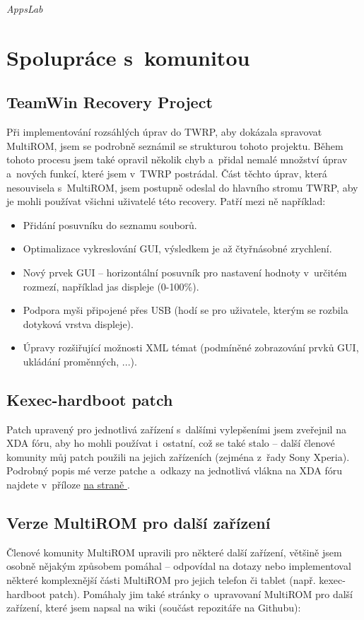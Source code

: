 \documentclass[12pt, a4paper, oneside]{article}
\newcommand{\It}{\textit}  %
\newcommand*{\attref}[1]{\hyperref[{#1}]{\uv{\nameref*{#1}} na straně \pageref{#1}}}
\begin{document}
\hfill \It{AppsLab\cite{appslab}}

\newpage
\section{Spolupráce s~komunitou}
\subsection{TeamWin Recovery Project}
\label{twrp-spoluprace}
Při implementování rozsáhlých úprav do TWRP, aby dokázala spravovat MultiROM, jsem se podrobně seznámil se strukturou tohoto projektu. Během tohoto procesu jsem také opravil několik chyb a~přidal nemalé množství úprav a~nových funkcí, které jsem v~TWRP postrádal. Část těchto úprav, která nesouvisela s~MultiROM, jsem postupně odeslal do hlavního stromu TWRP, aby je mohli používat všichni uživatelé této recovery. Patří mezi ně například:

\begin{itemize}
    \item Přidání posuvníku do seznamu souborů.
    \item Optimalizace vykreslování GUI, výsledkem je až čtyřnásobné zrychlení.
    \item Nový prvek GUI -- horizontální posuvník pro nastavení hodnoty v~určitém rozmezí, například jas displeje (0-100\%).
    \item Podpora myši připojené přes USB (hodí se pro uživatele, kterým se rozbila dotyková vrstva displeje).
    \item Úpravy rozšiřující možnosti XML témat (podmíněné zobrazování prvků GUI, ukládání proměnných, ...).
\end{itemize}

\subsection{Kexec-hardboot patch}
Patch upravený pro jednotlivá zařízení s~dalšími vylepšeními jsem zveřejnil na XDA fóru, aby ho mohli používat i~ostatní, což se také stalo -- další členové komunity můj patch použili na jejich zařízeních (zejména z~řady Sony Xperia). Podrobný popis mé verze patche a~odkazy na jednotlivá vlákna na XDA fóru najdete v~příloze \attref{sec:kexec-hardboot}.

\subsection{Verze MultiROM pro další zařízení}
Členové komunity MultiROM upravili pro některé další zařízení, většině jsem osobně nějakým způsobem pomáhal -- odpovídal na dotazy nebo implementoval některé komplexnější části MultiROM pro jejich telefon či tablet (např. kexec-hardboot patch). Pomáhaly jim také stránky o~upravovaní MultiROM pro další zařízení, které jsem napsal na wiki (součást repozitáře na Githubu):
\end{document}
